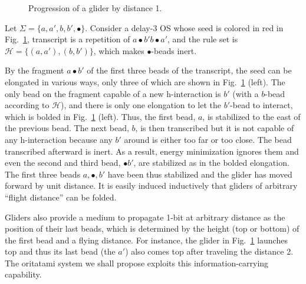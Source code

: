 \begin{figure}[htb]
{}
\caption{Progression of a glider by distance 1.}
\label{fig:glider}
\end{figure}


\begin{example}\label{ex:glider}
Let $\Sigma = \{a, a', b, b', \bullet\}$. 
Consider a delay-3 OS whose seed is colored in red in Fig.~\ref{fig:glider}, transcript is a repetition of $a \bullet b' b \bullet a'$, and the rule set is $\mathcal{H} = \{(a, a'), (b, b')\}$, which makes $\bullet$-beads inert. 

By the fragment $a \bullet b'$ of the first three beads of the transcript, the seed can be elongated in various ways, only three of which are shown in Fig.~\ref{fig:glider} (left). 
The only bead on the fragment capable of a new h-interaction is $b'$ (with a $b$-bead according to $\mathcal{H}$), and there is only one elongation to let the $b'$-bead to interact, which is bolded in Fig.~\ref{fig:glider} (left). 
Thus, the first bead, $a$, is stabilized to the east of the previous bead. 
The next bead, $b$, is then transcribed but it is not capable of any h-interaction because any $b'$ around is either too far or too close.  
The bead transcribed afterward is inert. 
As a result, energy minimization ignores them and even the second and third bead, $\bullet b'$, are stabilized as in the bolded elongation. 
The first three beads $a, \bullet, b'$ have been thus stabilized and the glider has moved forward by unit distance. 
It is easily induced inductively that gliders of arbitrary ``flight distance'' can be folded. 


Gliders also provide a medium to propagate 1-bit at arbitrary distance as the position of their last beads, which is determined by the height (top or bottom) of the first bead and a flying distance.  
For instance, the glider in Fig.~\ref{fig:glider} launches top and thus its last bead (the $a'$) also comes top after traveling the distance 2.
The oritatami system we shall propose exploits this information-carrying capability.
\end{example}

